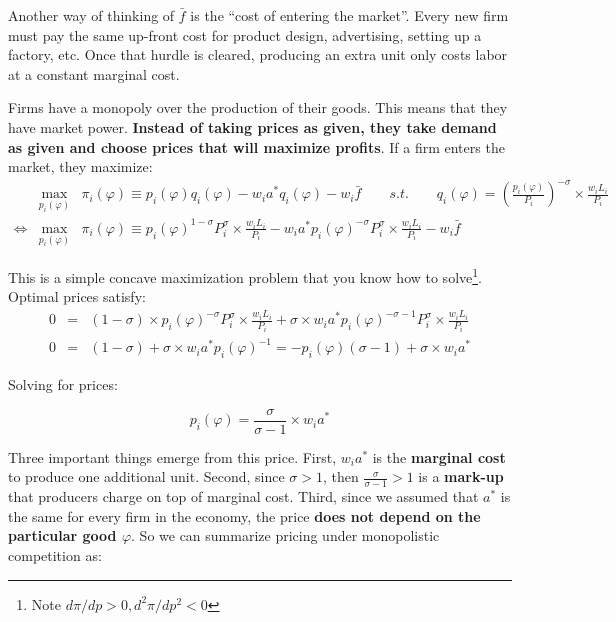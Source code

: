 \documentclass[11pt,letterpaper]{article}
\begin{document}
Another way of thinking of $\bar{f}$ is the ``cost of entering the market''. Every new  firm must pay the same up-front cost  for product design, advertising, setting up a factory, etc. Once that hurdle is cleared, producing an extra unit only costs labor at a constant marginal cost.

Firms have a monopoly over the production of their goods. This means that they have market power. \textbf{Instead of taking prices as given, they take demand as given and choose prices that will maximize profits}. If a firm enters the market, they maximize:
\begin{eqnarray*}
    &\max_{p_i(\varphi)}& \pi_i(\varphi) \equiv p_i(\varphi) q_i(\varphi) - w_i a^*q_i(\varphi) - w_i \bar{f} \qquad s.t. \qquad   q_i(\varphi) = \left( \frac{p_i(\varphi)}{P_i} \right)^{-\sigma}  \times \frac{w_iL_i}{P_i} \\
\iff &\max_{p_i(\varphi)}&  \pi_i(\varphi) \equiv p_i(\varphi)^{1-\sigma} P_i^{\sigma}  \times \frac{w_iL_i}{P_i} - w_i a^* p_i(\varphi)^{-\sigma} P_i^{\sigma}  \times \frac{w_iL_i}{P_i} - w_i \bar{f} 
\end{eqnarray*}

This is a simple concave maximization problem that you know how to solve\footnote{Note $d \pi / dp > 0, d^2 \pi / dp^2 < 0$}. Optimal prices satisfy:
\begin{eqnarray*}
    0 &=& (1-\sigma)\times p_i(\varphi)^{-\sigma} P_i^{\sigma}  \times \frac{w_iL_i}{P_i} + \sigma \times w_i a^* p_i(\varphi)^{-\sigma-1} P_i^{\sigma} \times \frac{w_iL_i}{P_i}  \\
    0 &=& (1-\sigma) + \sigma \times w_i a^* p_i(\varphi)^{-1}  = -p_i(\varphi)(\sigma-1) + \sigma \times w_i a^*
\end{eqnarray*}

Solving for prices:

\begin{equation*}
    \boxed{
    p_i(\varphi) = \frac{\sigma}{\sigma-1} \times w_i a^* 
    }
\end{equation*}

Three important things emerge from this price. First, $w_i a^*$ is the \textbf{marginal cost} to produce one additional unit. Second, since $\sigma > 1$, then  $\frac{\sigma}{\sigma-1} > 1$ is a \textbf{mark-up} that producers charge on top of marginal cost. Third, since we assumed that $a^*$ is the same for every firm in the economy, the price \textbf{does not depend on the particular good $\varphi$}. So we can summarize pricing under monopolistic competition as:
\end{document}

